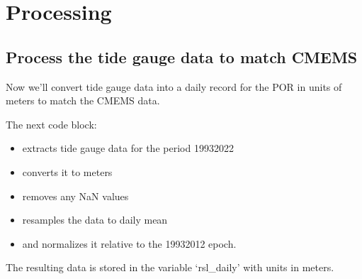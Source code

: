 \documentclass[letterpaper,10pt,english]{jupyterBook}
\begin{document}
\chapter{Processing}
\label{\detokenize{notebooks/SL_Data_Wrangling:processing}}

\section{Process the tide gauge data to match CMEMS}
\label{\detokenize{notebooks/SL_Data_Wrangling:process-the-tide-gauge-data-to-match-cmems}}
\sphinxAtStartPar
Now we’ll convert tide gauge data into a daily record for the POR in units of meters to match the CMEMS data.

\sphinxAtStartPar
The next code block:
\begin{itemize}
\item {} 
\sphinxAtStartPar
extracts tide gauge data for the period 1993\sphinxhyphen{}2022

\item {} 
\sphinxAtStartPar
converts it to meters

\item {} 
\sphinxAtStartPar
removes any NaN values

\item {} 
\sphinxAtStartPar
resamples the data to daily mean

\item {} 
\sphinxAtStartPar
and normalizes it relative to the 1993\sphinxhyphen{}2012 epoch.

\end{itemize}

\sphinxAtStartPar
The resulting data is stored in the variable ‘rsl\_daily’ with units in meters.
\end{document}
